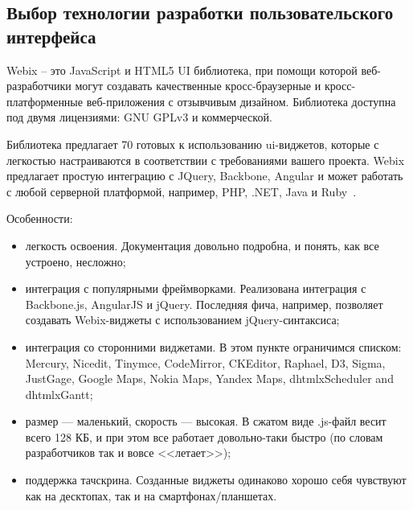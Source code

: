 \subsection{Выбор технологии разработки пользовательского интерфейса}
\label{sec:modeling:ui_technology}

Webix – это JavaScript и HTML5 UI библиотека, при помощи которой веб-разработчики могут создавать качественные кросс-браузерные и кросс-платформенные веб-приложения с отзывчивым дизайном. Библиотека доступна под двумя лицензиями: GNU GPLv3 и коммерческой.

Библиотека предлагает 70 готовых к использованию ui-виджетов, которые с легкостью настраиваются в соответствии с требованиями вашего проекта. Webix предлагает простую интеграцию с JQuery, Backbone, Angular и может работать с любой серверной платформой, например, PHP, .NET, Java и Ruby~\cite{what_is_webix}.

Особенности:

\begin{itemize}
    \item легкость освоения. Документация довольно подробна, и понять, как все устроено, несложно;
    \item интеграция с популярными фреймворками. Реализована интеграция с Backbone.js, AngularJS и jQuery. Последняя фича, например, позволяет создавать Webix-виджеты с использованием jQuery-синтаксиса;
    \item интеграция со сторонними виджетами. В этом пункте ограничимся списком: Mercury, Nicedit, Tinymce, CodeMirror, CKEditor, Raphael, D3, Sigma, JustGage, Google Maps, Nokia Maps, Yandex Maps, dhtmlxScheduler and dhtmlxGantt;
    \item размер — маленький, скорость — высокая. В сжатом виде .js-файл весит всего 128 КБ, и при этом все работает довольно-таки быстро (по словам разработчиков так и вовсе <<летает>>);
    \item поддержка тачскрина. Созданные виджеты одинаково хорошо себя чувствуют как на десктопах, так и на смартфонах/планшетах.
\end{itemize}

